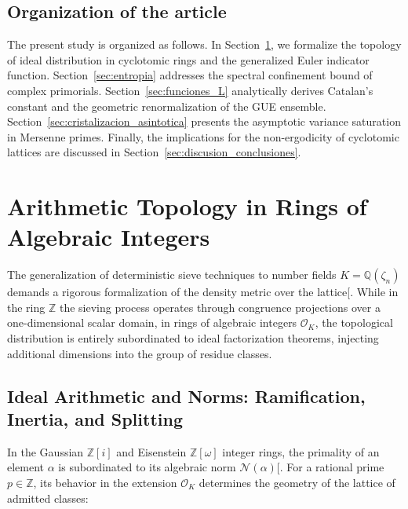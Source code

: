 \documentclass{article}
\numberwithin{equation}{section}
\theoremstyle{plain}
\theoremstyle{definition}
\begin{document}
\subsection*{Organization of the article}

The present study is organized as follows. In Section~\ref{sec:topologia}, we formalize the topology of ideal distribution in cyclotomic rings and the generalized Euler indicator function. Section~\ref{sec:entropia} addresses the spectral confinement bound of complex primorials. Section~\ref{sec:funciones_L} analytically derives Catalan's constant and the geometric renormalization of the GUE ensemble. Section~\ref{sec:cristalizacion_asintotica} presents the asymptotic variance saturation in Mersenne primes. Finally, the implications for the non-ergodicity of cyclotomic lattices are discussed in Section~\ref{sec:discusion_conclusiones}.

\section{Arithmetic Topology in Rings of Algebraic Integers}
\label{sec:topologia}

The generalization of deterministic sieve techniques to number fields $K = \mathbb{Q}(\zeta_n)$ demands a rigorous formalization of the density metric over the lattice[. While in the ring $\mathbb{Z}$ the sieving process operates through congruence projections over a one-dimensional scalar domain, in rings of algebraic integers $\mathcal{O}_K$, the topological distribution is entirely subordinated to ideal factorization theorems, injecting additional dimensions into the group of residue classes.

\subsection{Ideal Arithmetic and Norms: Ramification, Inertia, and Splitting}

In the Gaussian $\mathbb{Z}[i]$ and Eisenstein $\mathbb{Z}[\omega]$ integer rings, the primality of an element $\alpha$ is subordinated to its algebraic norm $\mathcal{N}(\alpha)$[. For a rational prime $p \in \mathbb{Z}$, its behavior in the extension $\mathcal{O}_K$ determines the geometry of the lattice of admitted classes:
\end{document}
